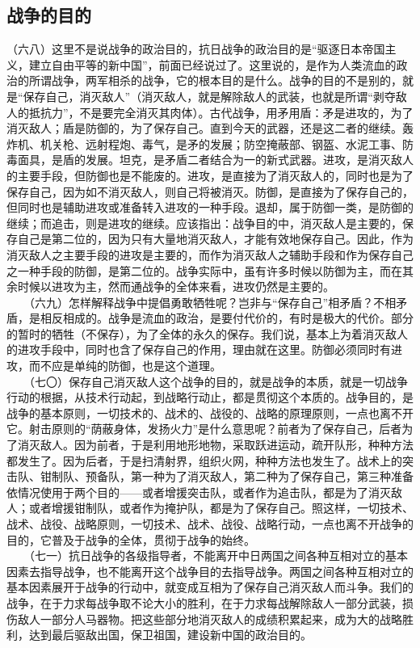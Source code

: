 \documentclass[cn,11pt,chinese]{elegantbook}
\def\myformat#1{\hfil\hfil #1}
\begin{document}
\subsection*{\myformat{战争的目的}}
（六八）这里不是说战争的政治目的，抗日战争的政治目的是“驱逐日本帝国主义，建立自由平等的新中国”，前面已经说过了。这里说的，是作为人类流血的政治的所谓战争，两军相杀的战争，它的根本目的是什么。战争的目的不是别的，就是“保存自己，消灭敌人”（消灭敌人，就是解除敌人的武装，也就是所谓“剥夺敌人的抵抗力”，不是要完全消灭其肉体）。古代战争，用矛用盾：矛是进攻的，为了消灭敌人；盾是防御的，为了保存自己。直到今天的武器，还是这二者的继续。轰炸机、机关枪、远射程炮、毒气，是矛的发展；防空掩蔽部、钢盔、水泥工事、防毒面具，是盾的发展。坦克，是矛盾二者结合为一的新式武器。进攻，是消灭敌人的主要手段，但防御也是不能废的。进攻，是直接为了消灭敌人的，同时也是为了保存自己，因为如不消灭敌人，则自己将被消灭。防御，是直接为了保存自己的，但同时也是辅助进攻或准备转入进攻的一种手段。退却，属于防御一类，是防御的继续；而追击，则是进攻的继续。应该指出：战争目的中，消灭敌人是主要的，保存自己是第二位的，因为只有大量地消灭敌人，才能有效地保存自己。因此，作为消灭敌人之主要手段的进攻是主要的，而作为消灭敌人之辅助手段和作为保存自己之一种手段的防御，是第二位的。战争实际中，虽有许多时候以防御为主，而在其余时候以进攻为主，然而通战争的全体来看，进攻仍然是主要的。\\
　　（六九）怎样解释战争中提倡勇敢牺牲呢？岂非与“保存自己”相矛盾？不相矛盾，是相反相成的。战争是流血的政治，是要付代价的，有时是极大的代价。部分的暂时的牺牲（不保存），为了全体的永久的保存。我们说，基本上为着消灭敌人的进攻手段中，同时也含了保存自己的作用，理由就在这里。防御必须同时有进攻，而不应是单纯的防御，也是这个道理。\\
　　（七〇）保存自己消灭敌人这个战争的目的，就是战争的本质，就是一切战争行动的根据，从技术行动起，到战略行动止，都是贯彻这个本质的。战争目的，是战争的基本原则，一切技术的、战术的、战役的、战略的原理原则，一点也离不开它。射击原则的“荫蔽身体，发扬火力”是什么意思呢？前者为了保存自己，后者为了消灭敌人。因为前者，于是利用地形地物，采取跃进运动，疏开队形，种种方法都发生了。因为后者，于是扫清射界，组织火网，种种方法也发生了。战术上的突击队、钳制队、预备队，第一种为了消灭敌人，第二种为了保存自己，第三种准备依情况使用于两个目的——或者增援突击队，或者作为追击队，都是为了消灭敌人；或者增援钳制队，或者作为掩护队，都是为了保存自己。照这样，一切技术、战术、战役、战略原则，一切技术、战术、战役、战略行动，一点也离不开战争的目的，它普及于战争的全体，贯彻于战争的始终。\\
　　（七一）抗日战争的各级指导者，不能离开中日两国之间各种互相对立的基本因素去指导战争，也不能离开这个战争目的去指导战争。两国之间各种互相对立的基本因素展开于战争的行动中，就变成互相为了保存自己消灭敌人而斗争。我们的战争，在于力求每战争取不论大小的胜利，在于力求每战解除敌人一部分武装，损伤敌人一部分人马器物。把这些部分地消灭敌人的成绩积累起来，成为大的战略胜利，达到最后驱敌出国，保卫祖国，建设新中国的政治目的。\\
\end{document}

